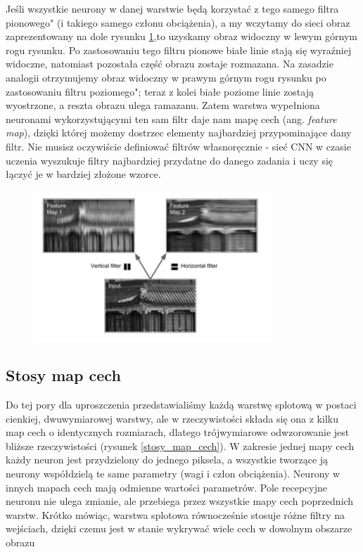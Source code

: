 \documentclass{article}
\begin{document}
Jeśli wszystkie neurony w danej warstwie będą korzystać z tego samego filtra pionowego" (i takiego samego członu obciążenia), a my wczytamy do sieci obraz zaprezentowany na dole rysunku \ref{filters},to uzyskamy obraz widoczny w lewym górnym rogu rysunku. Po zastosowaniu tego filtru pionowe białe linie stają się wyraźniej widoczne, natomiast pozostała część obrazu zostaje rozmazana. Na zasadzie analogii otrzymujemy obraz widoczny w prawym górnym rogu rysunku po zastosowaniu filtru poziomego"; teraz z kolei białe poziome linie zostają wyostrzone, a reszta obrazu ulega ramazanu. Zatem warstwa wypełniona neuronami wykorzystującymi ten sam filtr daje nam mapę cech (ang. \textit{feature map}), dzięki której możemy dostrzec elementy najbardziej przypominające dany filtr. Nie musisz oczywiście definiować filtrów własnoręcznie - sieć CNN w czasie uczenia wyszukuje filtry najbardziej przydatne do danego zadania i uczy się łączyć je w bardziej złożone
wzorce. \cite{geron}
\begin{figure}[H]
	\centering
	\includegraphics[width=0.8\textwidth,keepaspectratio=true]{filters}
	\caption{}
	\label{filters}
\end{figure}

\subsection{Stosy map cech}
Do tej pory dla uproszczenia przedstawialiśmy każdą warstwę splotową w postaci cienkiej, dwuwymiarowej warstwy, ale w rzeczywistości składa się ona z kilku map cech o identycznych rozmiarach, dlatego trójwymiarowe odwzorowanie jest bliższe rzeczywistości (rysunek \ref{stosy_map_cech}). W zakresie jednej mapy cech każdy neuron jest przydzielony do jednego piksela, a wszystkie tworzące ją neurony współdzielą te same parametry (wagi i człon obciążenia). Neurony w innych mapach cech mają odmienne wartości parametrów. Pole recepcyjne neuronu nie ulega zmianie, ale przebiega przez wszystkie mapy cech poprzednich warstw. Krótko mówiąc, warstwa splotowa równocześnie stosuje różne filtry na wejściach, dzięki czemu jest w stanie wykrywać wiele cech w dowolnym obszarze obrazu \cite{geron}
\end{document}
